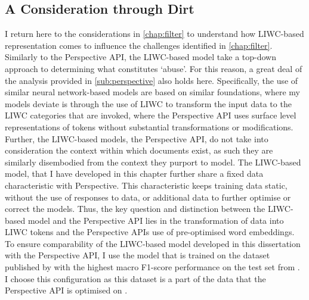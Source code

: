 
\subsection{A Consideration through Dirt}\label{sub:LIWC_model}
I return here to the considerations in \cref{chap:filter} to understand how LIWC-based representation comes to influence the challenges identified in \cref{chap:filter}.
Similarly to the Perspective API, the LIWC-based model take a top-down approach to determining what constitutes `abuse'. For this reason, a great deal of the analysis provided in \cref{sub:perspective} also holds here.
Specifically, the use of similar neural network-based models are based on similar foundations, where my models deviate is through the use of LIWC \cite{Pennebaker:2001} to transform the input data to the LIWC categories that are invoked, where the Perspective API uses surface level representations of tokens without substantial transformations or modifications.
Further, the LIWC-based models,  the Perspective API, do not take into consideration the context within which documents exist, as such they are similarly disembodied from the context they purport to model.
The LIWC-based model, that I have developed in this chapter further share a fixed data characteristic with Perspective.
This characteristic keeps training data static, without the use of responses to data, or additional data to further optimise or correct the models.
Thus, the key question and distinction between the LIWC-based model and the Perspective API lies in the transformation of data into LIWC tokens and the Perspective APIs use of pre-optimised word embeddings.
To ensure comparability of the LIWC-based model developed in this dissertation with the Perspective API, I use the model that is trained on the dataset published by \citet{Wulczyn:2017} with the highest macro F1-score performance on the test set from \citet{Wulczyn:2017}.
I choose this configuration as this dataset is a part of the data that the Perspective API is optimised on \citep{Perspective:Github}.

